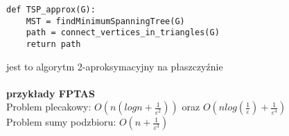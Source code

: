 \documentclass{article}
\begin{document}
\begin{lstlisting}
def TSP_approx(G):
	MST = findMinimumSpanningTree(G)
	path = connect_vertices_in_triangles(G)
	return path
\end{lstlisting}
jest to algorytm 2-aproksymacyjny na płaszczyźnie \\\\
\textbf{przykłady FPTAS} \\
Problem plecakowy: $O(n(logn + \frac{1}{\varepsilon^2}))$ oraz $O(nlog(\frac{1}{\varepsilon}) + \frac{1}{\varepsilon^4} )$ \\
Problem sumy podzbioru: $O(n + \frac{1}{\varepsilon^3})$ \\\\
\end{document}
